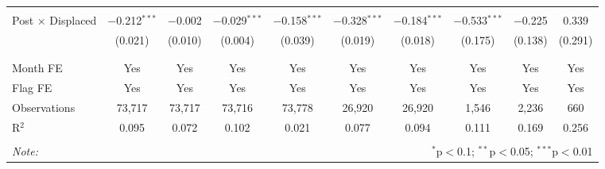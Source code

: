 \documentclass[12pt]{article}
\begin{document}
\begin{landscape}
\begin{table}[H]
\begin{tabular}{@{\extracolsep{1pt}}lccccccccc}
  & & & & & & & & & \\ 
 Post $\times$ Displaced & $-$0.212$^{***}$ & $-$0.002 & $-$0.029$^{***}$ & $-$0.158$^{***}$ & $-$0.328$^{***}$ & $-$0.184$^{***}$ & $-$0.533$^{***}$ & $-$0.225 & 0.339 \\ 
  & (0.021) & (0.010) & (0.004) & (0.039) & (0.019) & (0.018) & (0.175) & (0.138) & (0.291) \\ 
  & & & & & & & & & \\ 
\hline \\[-1.8ex] 
Month FE & Yes & Yes & Yes & Yes & Yes & Yes & Yes & Yes & Yes \\ 
Flag FE & Yes & Yes & Yes & Yes & Yes & Yes & Yes & Yes & Yes \\ 
Observations & 73,717 & 73,717 & 73,716 & 73,778 & 26,920 & 26,920 & 1,546 & 2,236 & 660 \\ 
R$^{2}$ & 0.095 & 0.072 & 0.102 & 0.021 & 0.077 & 0.094 & 0.111 & 0.169 & 0.256 \\ 
\hline 
\hline \\[-1.8ex] 
\textit{Note:}  & \multicolumn{9}{r}{$^{*}$p$<$0.1; $^{**}$p$<$0.05; $^{***}$p$<$0.01} \\ 
\end{tabular} 
\end{table} 
\end{landscape}
\end{document}
